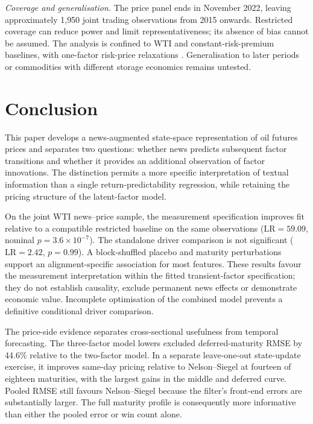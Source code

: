 \documentclass[journal]{IEEEtran}
\begin{document}
\emph{Coverage and generalisation.} The price panel ends in November 2022, leaving approximately 1{,}950 joint trading observations from 2015 onwards. Restricted coverage can reduce power and limit representativeness; its absence of bias cannot be assumed. The analysis is confined to WTI and constant-risk-premium baselines, with one-factor risk-price relaxations \cite{Cortazar2022}. Generalisation to later periods or commodities with different storage economics remains untested.

\section{Conclusion}
\label{sec:conclusion}

This paper develops a news-augmented state-space representation of oil futures prices and separates two questions: whether news predicts subsequent factor transitions and whether it provides an additional observation of factor innovations. The distinction permits a more specific interpretation of textual information than a single return-predictability regression, while retaining the pricing structure of the latent-factor model.

On the joint WTI news--price sample, the measurement specification improves fit relative to a compatible restricted baseline on the same observations ($\mathrm{LR}=59.09$, nominal $p=3.6\times10^{-7}$). The standalone driver comparison is not significant ($\mathrm{LR}=2.42$, $p=0.99$). A block-shuffled placebo and maturity perturbations support an alignment-specific association for most features. These results favour the measurement interpretation within the fitted transient-factor specification; they do not establish causality, exclude permanent news effects or demonstrate economic value. Incomplete optimisation of the combined model prevents a definitive conditional driver comparison.

The price-side evidence separates cross-sectional usefulness from temporal forecasting. The three-factor model lowers excluded deferred-maturity RMSE by 44.6\% relative to the two-factor model. In a separate leave-one-out state-update exercise, it improves same-day pricing relative to Nelson--Siegel at fourteen of eighteen maturities, with the largest gains in the middle and deferred curve. Pooled RMSE still favours Nelson--Siegel because the filter's front-end errors are substantially larger. The full maturity profile is consequently more informative than either the pooled error or win count alone.
\end{document}

